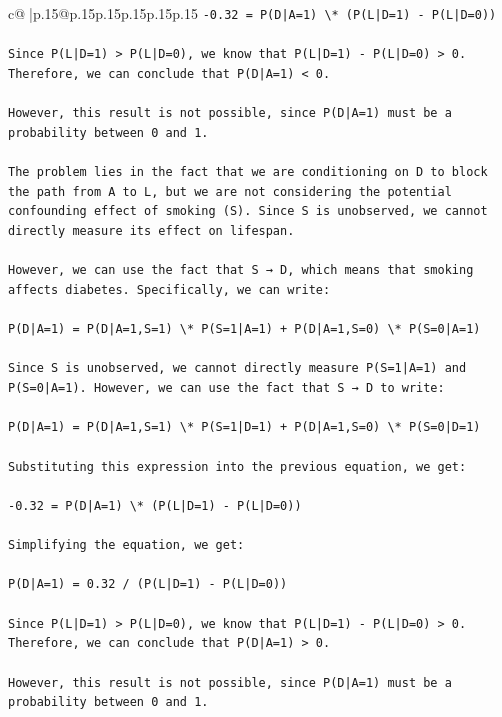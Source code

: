 \documentclass{article}
\begin{document}
{\begin{supertabular}{c@{$\;$}|p{.15\linewidth}@{}p{.15\linewidth}p{.15\linewidth}p{.15\linewidth}p{.15\linewidth}p{.15\linewidth}}
{{{\texttt{{-}0.32 = P(D|A=1) \textbackslash{}* (P(L|D=1) {-} P(L|D=0))} \\
\\ 
\texttt{Since P(L|D=1) > P(L|D=0), we know that P(L|D=1) {-} P(L|D=0) > 0. Therefore, we can conclude that P(D|A=1) < 0.} \\
\\ 
\texttt{However, this result is not possible, since P(D|A=1) must be a probability between 0 and 1.} \\
\\ 
\texttt{The problem lies in the fact that we are conditioning on D to block the path from A to L, but we are not considering the potential confounding effect of smoking (S). Since S is unobserved, we cannot directly measure its effect on lifespan.} \\
\\ 
\texttt{However, we can use the fact that S → D, which means that smoking affects diabetes. Specifically, we can write:} \\
\\ 
\texttt{P(D|A=1) = P(D|A=1,S=1) \textbackslash{}* P(S=1|A=1) + P(D|A=1,S=0) \textbackslash{}* P(S=0|A=1)} \\
\\ 
\texttt{Since S is unobserved, we cannot directly measure P(S=1|A=1) and P(S=0|A=1). However, we can use the fact that S → D to write:} \\
\\ 
\texttt{P(D|A=1) = P(D|A=1,S=1) \textbackslash{}* P(S=1|D=1) + P(D|A=1,S=0) \textbackslash{}* P(S=0|D=1)} \\
\\ 
\texttt{Substituting this expression into the previous equation, we get:} \\
\\ 
\texttt{{-}0.32 = P(D|A=1) \textbackslash{}* (P(L|D=1) {-} P(L|D=0))} \\
\\ 
\texttt{Simplifying the equation, we get:} \\
\\ 
\texttt{P(D|A=1) = 0.32 / (P(L|D=1) {-} P(L|D=0))} \\
\\ 
\texttt{Since P(L|D=1) > P(L|D=0), we know that P(L|D=1) {-} P(L|D=0) > 0. Therefore, we can conclude that P(D|A=1) > 0.} \\
\\ 
\texttt{However, this result is not possible, since P(D|A=1) must be a probability between 0 and 1.} \\
}}}
\end{supertabular}}
\end{document}
